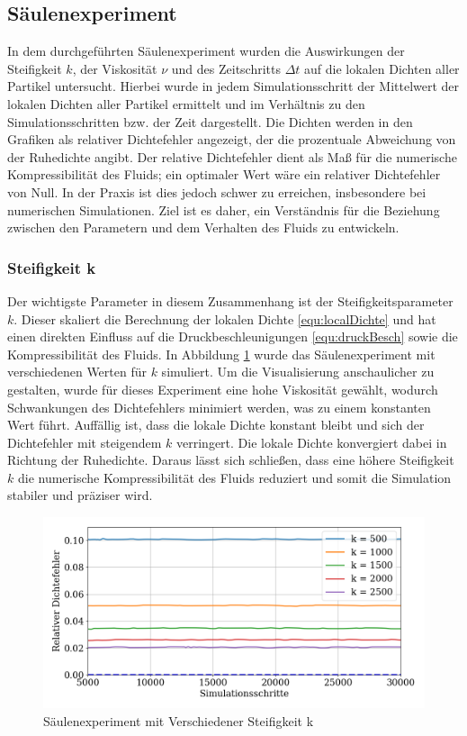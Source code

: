 \documentclass[a4paper, 12pt]{article}
\begin{document}
\subsection{Säulenexperiment}

In dem durchgeführten Säulenexperiment wurden die Auswirkungen der Steifigkeit \(k\), der Viskosität \(\nu\) und des Zeitschritts \(\Delta t\) auf die lokalen Dichten aller Partikel untersucht. Hierbei wurde in jedem Simulationsschritt der Mittelwert der lokalen Dichten aller Partikel ermittelt und im Verhältnis zu den Simulationsschritten bzw. der Zeit dargestellt. Die Dichten werden in den Grafiken als relativer Dichtefehler angezeigt, der die prozentuale Abweichung von der Ruhedichte angibt. Der relative Dichtefehler dient als Maß für die numerische Kompressibilität des Fluids; ein optimaler Wert wäre ein relativer Dichtefehler von Null. In der Praxis ist dies jedoch schwer zu erreichen, insbesondere bei numerischen Simulationen. Ziel ist es daher, ein Verständnis für die Beziehung zwischen den Parametern und dem Verhalten des Fluids zu entwickeln.

\subsubsection{Steifigkeit k}
Der wichtigste Parameter in diesem Zusammenhang ist der Steifigkeitsparameter \(k\). Dieser skaliert die Berechnung der lokalen Dichte \eqref{equ:localDichte} und hat einen direkten Einfluss auf die Druckbeschleunigungen \eqref{equ:druckBesch} sowie die Kompressibilität des Fluids. In Abbildung \ref{Säulenexperiment_k} wurde das Säulenexperiment mit verschiedenen Werten für \(k\) simuliert. Um die Visualisierung anschaulicher zu gestalten, wurde für dieses Experiment eine hohe Viskosität gewählt, wodurch Schwankungen des Dichtefehlers minimiert werden, was zu einem konstanten Wert führt. Auffällig ist, dass die lokale Dichte konstant bleibt und sich der Dichtefehler mit steigendem \(k\) verringert. Die lokale Dichte konvergiert dabei in Richtung der Ruhedichte. Daraus lässt sich schließen, dass eine höhere Steifigkeit \(k\) die numerische Kompressibilität des Fluids reduziert und somit die Simulation stabiler und präziser wird.

\begin{figure}[H]
	\centering
	\includegraphics[width=.85\textwidth]{graphics/Steifigkeit.png}	
	\caption{Säulenexperiment mit Verschiedener Steifigkeit k}
	\label{Säulenexperiment_k}
\end{figure}
\end{document}
